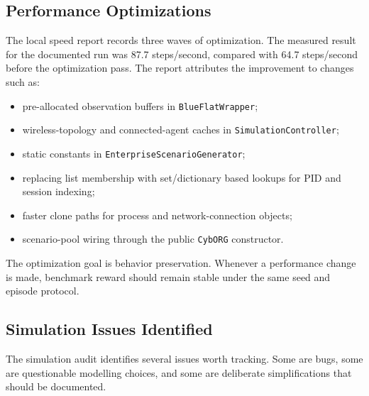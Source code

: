 \subsection{Performance Optimizations}

The local speed report records three waves of optimization. The measured result for the documented run was 87.7 steps/second, compared with 64.7 steps/second before the optimization pass. The report attributes the improvement to changes such as:

\begin{itemize}
  \item pre-allocated observation buffers in \texttt{BlueFlatWrapper};
  \item wireless-topology and connected-agent caches in \texttt{SimulationController};
  \item static constants in \texttt{EnterpriseScenarioGenerator};
  \item replacing list membership with set/dictionary based lookups for PID and session indexing;
  \item faster clone paths for process and network-connection objects;
  \item scenario-pool wiring through the public \texttt{CybORG} constructor.
\end{itemize}

The optimization goal is behavior preservation. Whenever a performance change is made, benchmark reward should remain stable under the same seed and episode protocol.

\subsection{Simulation Issues Identified}

The simulation audit identifies several issues worth tracking. Some are bugs, some are questionable modelling choices, and some are deliberate simplifications that should be documented.

